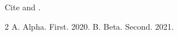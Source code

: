 \documentclass{article}
\begin{document}
Cite \citep{key_one,key_two} and \citet{key_one}.
\begin{thebibliography}{2}
 A. Alpha. First. 2020.
 B. Beta. Second. 2021.
\end{thebibliography}
\end{document}
